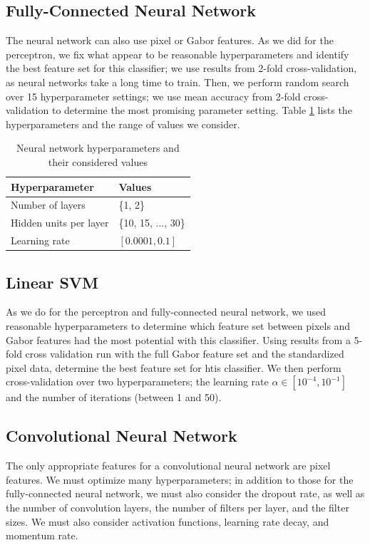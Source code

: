 \documentclass{acm_proc_article-sp}
\begin{document}
\subsection{Fully-Connected Neural Network}
The neural network can also use pixel or Gabor features. As we did for the perceptron, we fix what appear to be reasonable hyperparameters and identify the best feature set for this classifier; we use results from 2-fold cross-validation, as neural networks take a long time to train. Then, we perform random search over 15 hyperparameter settings; we use mean accuracy from 2-fold cross-validation to determine the most promising parameter setting. Table \ref{tab:nn-hyp} lists the hyperparameters and the range of values we consider.
\begin{table}[h!]
  \centering
  \begin{tabular}{|l|l|}
    \hline 
    {\bfseries Hyperparameter} & {\bfseries Values}\\
    \hline \hline
    Number of layers & \{1, 2\} \\
    Hidden units per layer & \{10, 15, ..., 30\} \\
    Learning rate & $[0.0001, 0.1]$ \\
    \hline
  \end{tabular}
  \caption{Neural network hyperparameters and their considered values}
  \label{tab:nn-hyp}
\end{table}


\subsection{Linear SVM}
As we do for the perceptron and fully-connected neural network, we used reasonable hyperparameters to determine which feature set between pixels and Gabor features had the most potential with this classifier. Using results from a 5-fold cross validation run with the full Gabor feature set and the standardized pixel data, determine the best feature set for htis classifier. We then perform cross-validation over two hyperparameters; the learning rate $\alpha \in [10^{-4},10^{-1}]$  and the number of iterations (between 1 and 50). 

\subsection{Convolutional Neural Network}
The only appropriate features for a convolutional neural network are pixel features. We must optimize many hyperparameters; in addition to those for the fully-connected neural network, we must also consider the dropout rate, as well as the number of convolution layers, the number of filters per layer, and the filter sizes. We must also consider activation functions, learning rate decay, and momentum rate. 
\end{document}
